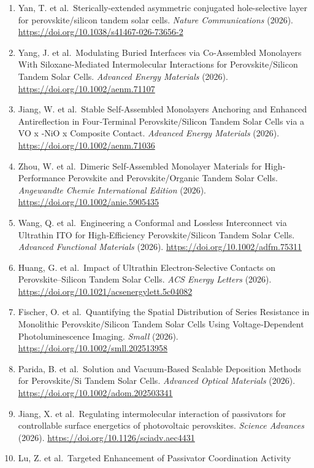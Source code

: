 \documentclass[
  11pt,
]{article}
\begin{document}
\begin{enumerate}
\item
  Yan, T. et al.~Sterically-extended asymmetric conjugated
  hole-selective layer for perovskite/silicon tandem solar cells.
  \emph{Nature Communications} (2026).
  \url{https://doi.org/10.1038/s41467-026-73656-2}
\item
  Yang, J. et al.~Modulating Buried Interfaces via Co‐Assembled
  Monolayers With Siloxane‐Mediated Intermolecular Interactions for
  Perovskite/Silicon Tandem Solar Cells. \emph{Advanced Energy
  Materials} (2026). \url{https://doi.org/10.1002/aenm.71107}
\item
  Jiang, W. et al.~Stable Self‐Assembled Monolayers Anchoring and
  Enhanced Antireflection in Four‐Terminal Perovskite/Silicon Tandem
  Solar Cells via a VO x ‐NiO x Composite Contact. \emph{Advanced Energy
  Materials} (2026). \url{https://doi.org/10.1002/aenm.71036}
\item
  Zhou, W. et al.~Dimeric Self‐Assembled Monolayer Materials for
  High‐Performance Perovskite and Perovskite/Organic Tandem Solar Cells.
  \emph{Angewandte Chemie International Edition} (2026).
  \url{https://doi.org/10.1002/anie.5905435}
\item
  Wang, Q. et al.~Engineering a Conformal and Lossless Interconnect via
  Ultrathin ITO for High‐Efficiency Perovskite/Silicon Tandem Solar
  Cells. \emph{Advanced Functional Materials} (2026).
  \url{https://doi.org/10.1002/adfm.75311}
\item
  Huang, G. et al.~Impact of Ultrathin Electron-Selective Contacts on
  Perovskite--Silicon Tandem Solar Cells. \emph{ACS Energy Letters}
  (2026). \url{https://doi.org/10.1021/acsenergylett.5c04082}
\item
  Fischer, O. et al.~Quantifying the Spatial Distribution of Series
  Resistance in Monolithic Perovskite/Silicon Tandem Solar Cells Using
  Voltage‐Dependent Photoluminescence Imaging. \emph{Small} (2026).
  \url{https://doi.org/10.1002/smll.202513958}
\item
  Parida, B. et al.~Solution and Vacuum‐Based Scalable Deposition
  Methods for Perovskite/Si Tandem Solar Cells. \emph{Advanced Optical
  Materials} (2026). \url{https://doi.org/10.1002/adom.202503341}
\item
  Jiang, X. et al.~Regulating intermolecular interaction of passivators
  for controllable surface energetics of photovoltaic perovskites.
  \emph{Science Advances} (2026).
  \url{https://doi.org/10.1126/sciadv.aec4431}
\item
  Lu, Z. et al.~Targeted Enhancement of Passivator Coordination Activity

\end{enumerate}
\end{document}
